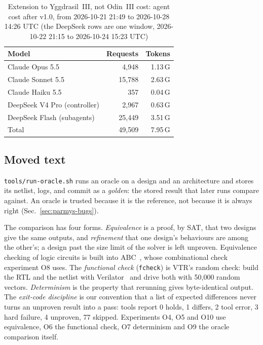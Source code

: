 \documentclass[conference]{IEEEtran}
\newcommand{\code}[1]{\texttt{#1}}
\begin{document}
\begin{table}[t]
\caption{Extension to Yggdrasil~III, not Odin~III cost: agent cost after v1.0, from 2026-10-21 21:49 to 2026-10-28 14:26 UTC (the DeepSeek rows are one window, 2026-10-22 21:15 to 2026-10-24 15:23 UTC)}
\label{tab:cost2}
\centering
\footnotesize
\begin{tabular}{@{}lrr@{}}
\toprule
Model & Requests & Tokens \\
\midrule
Claude Opus 5.5 & 4,948 & 1.13\,G \\
Claude Sonnet 5.5 & 15,788 & 2.63\,G \\
Claude Haiku 5.5 & 357 & 0.04\,G \\
DeepSeek V4 Pro (controller) & 2,967 & 0.63\,G \\
DeepSeek Flash (subagents) & 25,449 & 3.51\,G \\
\midrule
Total & 49,509 & 7.95\,G \\
\bottomrule
\end{tabular}
\end{table}

\subsection{Moved text}

\code{tools/run-oracle.sh} runs an oracle on a design and an architecture and stores its netlist, logs, and commit as a \emph{golden}: the stored result that later runs compare against.
An oracle is trusted because it is the reference, not because it is always right (Sec.~\ref{sec:parmys-bugs}).

The comparison has four forms. \emph{Equivalence} is a proof, by SAT, that two designs give the same outputs, and \emph{refinement} that one design's behaviours are among the other's; a design past the size limit of the solver is left unproven.
Equivalence checking of logic circuits is built into ABC~, whose combinational check experiment O8 uses. The \emph{functional check} (\code{fcheck}) is VTR's random check: build the RTL and the netlist with Verilator~ and drive both with 50,000 random vectors.
\emph{Determinism} is the property that rerunning gives byte-identical output.
The \emph{exit-code discipline} is our convention that a list of expected differences never turns an unproven result into a pass: tools report 0 holds, 1 differs, 2 tool error, 3 hard failure, 4 unproven, 77 skipped.
Experiments O4, O5 and O10 use equivalence, O6 the functional check, O7 determinism and O9 the oracle comparison itself.
\end{document}
